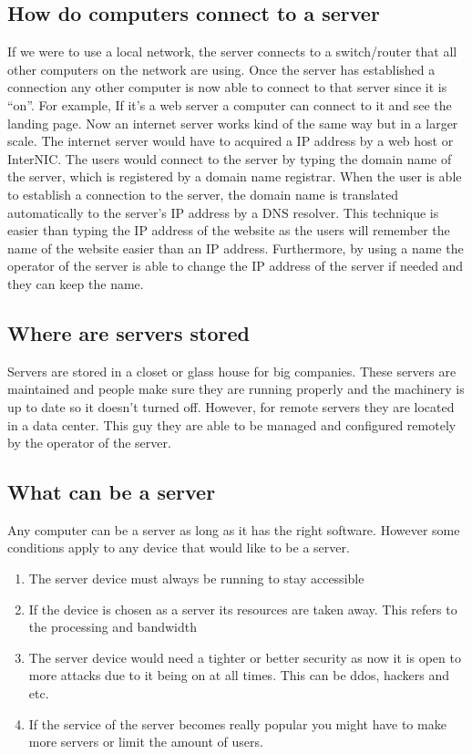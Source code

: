 \documentclass[conference]{IEEEtran}
\begin{document}
\subsection*{How do computers connect to a server}
If we were to use a local network, the server connects to a switch/router that all other computers on the network are using. Once the server has established a connection any other computer is now able to connect to that server since it is “on”. For example, If it’s a web server a computer can connect to it and see the landing page. Now an internet server works kind of the same way but in a larger scale. The internet server would have to acquired a IP address by a web host or InterNIC. The users would connect to the server by typing the domain name of the server, which is registered by a domain name registrar. When the user is able to establish a connection to the server, the domain name is translated automatically to the server’s IP address by a DNS resolver. This technique is easier than typing the IP address of the website as the users will remember the name of the website easier than an IP address. Furthermore, by using a name the operator of the server is able to change the IP address of the server if needed and they can keep the name.
\linebreak
\subsection*{Where are servers stored}
Servers are stored in a closet or glass house for big companies. These servers are maintained and people make sure they are running properly and the machinery is up to date so it doesn’t turned off. However, for remote servers they are located in a data center. This guy they are able to be managed and configured remotely by the operator of the server.
\linebreak
\subsection*{What can be a server}
Any computer can be a server as long as it has the right software. However some conditions apply to any device that would like to be a server.
\begin{enumerate}
	\item The server device must always be running to stay accessible
	\item If the device is chosen as a server its resources are taken away. This refers to the processing and bandwidth
	\item The server device would need a tighter or better security as now it is open to more attacks due to it being on at all times. This can be ddos, hackers and etc.
	\item If the service of the server becomes really popular you might have to make more servers or limit the amount of users.
\end{enumerate}
\end{document}
